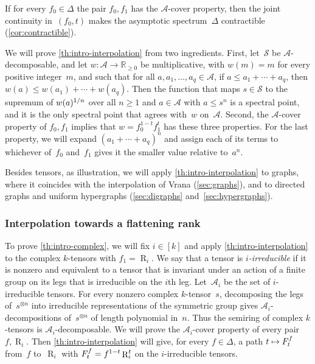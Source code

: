 \documentclass[11pt,letterpaper]{article}
\DeclareMathOperator{\tensorrank}{R}
\newcommand{\RR}{\mathbb{R}}
\begin{document}
If for every \(f_0\in\Delta\) the pair \(f_0,f_1\) has the \(\mathcal{A}\)-cover property, then the joint continuity in~\((f_0,t)\) makes the asymptotic spectrum~\(\Delta\) contractible (\cref{cor:contractible}).

We will prove \cref{th:intro-interpolation} from two ingredients. First, let~\(\mathcal{S}\) be \(\mathcal{A}\)-decomposable, and let \(w:\mathcal{A}\to\RR_{\geq0}\) be multiplicative, with \(w(m)=m\) for every positive integer~\(m\), and such that for all \(a,a_1,\ldots,a_q\in\mathcal{A}\), if \(a\leq a_1+\cdots+a_q\), then \(w(a)\leq w(a_1)+\cdots+w(a_q)\). Then the function that maps \(s\in\mathcal{S}\) to the supremum of \(w(a)^{\smash{1/n}}\) over all \(n\geq1\) and \(a\in\mathcal{A}\) with \(a\leq s^n\) is a spectral point, and it is the only spectral point that agrees with~\(w\) on~\(\mathcal{A}\). Second, the \(\mathcal{A}\)-cover property of \(f_0,f_1\) implies that \(w=f_0^{1-t}f_1^t\) has these three properties. For the last property, we will expand \((a_1+\cdots+a_q)^n\) and assign each of its terms to whichever of~\(f_0\) and~\(f_1\) gives it the smaller value relative to~\(a^n\).

Besides tensors, as illustration, we will apply \cref{th:intro-interpolation} to graphs, where it coincides with the interpolation of Vrana \cite{MR4357434} (\cref{sec:graphs}), and to directed graphs and uniform hypergraphs (\cref{sec:digraphs} and~\cref{sec:hypergraphs}).

\subsubsection{Interpolation towards a flattening rank}

To prove \cref{th:intro-complex}, we will fix \(i\in[k]\) and apply \cref{th:intro-interpolation} to the complex \(k\)-tensors with \(f_1=\tensorrank_i\). We say that a tensor is \emph{\(i\)-irreducible} if it is nonzero and equivalent to a tensor that is invariant under an action of a finite group on its legs that is irreducible on the \(i\)th leg. Let~\(\mathcal{A}_i\) be the set of \(i\)-irreducible tensors. For every nonzero complex \(k\)-tensor~\(s\), decomposing the legs of~\(s^{\otimes n}\) into irreducible representations of the symmetric group gives \(\mathcal{A}_i\)-decompositions of~\(s^{\otimes n}\) of length polynomial in~\(n\). Thus the semiring of complex \(k\)-tensors is \(\mathcal{A}_i\)-decomposable. We will prove the \(\mathcal{A}_i\)-cover property of every pair \(f,\tensorrank_i\). Then \cref{th:intro-interpolation} will give, for every \(f\in\Delta\), a path \(t\mapsto F^{\smash[t]{f}}_t\) from~\(f\) to~\(\tensorrank_i\) with \(F^{\smash[t]{f}}_t=f^{1-t}\tensorrank_i^t\) on the \(i\)-irreducible tensors.
\end{document}
